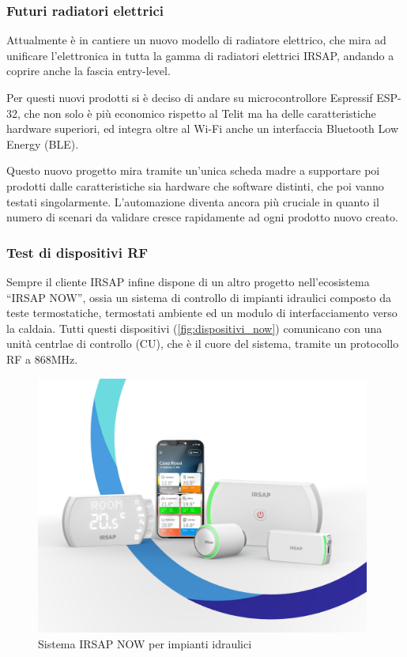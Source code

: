 \documentclass[12pt,a4paper,twoside,titlepage]{book}
\begin{document}
\subsubsection{Futuri radiatori elettrici}

Attualmente è in cantiere un nuovo modello di radiatore elettrico,
che mira ad unificare l'elettronica in tutta la gamma di radiatori elettrici
IRSAP, andando a coprire anche la fascia entry-level.

Per questi nuovi prodotti si è deciso di andare su microcontrollore Espressif
ESP-32, che non solo è più economico rispetto al Telit ma ha delle caratteristiche
hardware superiori, ed integra oltre al Wi-Fi anche un interfaccia Bluetooth Low Energy (BLE).

Questo nuovo progetto mira tramite un'unica scheda madre a supportare poi
prodotti dalle caratteristiche sia hardware che software distinti, che poi vanno
testati singolarmente. L'automazione diventa ancora più cruciale in quanto il
numero di scenari da validare cresce rapidamente ad ogni prodotto nuovo creato.

\subsubsection{Test di dispositivi RF}

Sempre il cliente IRSAP infine dispone di un altro progetto nell'ecosistema ``IRSAP NOW'',
ossia un sistema di controllo di impianti idraulici composto da teste termostatiche,
termostati ambiente ed un modulo di interfacciamento verso la caldaia. Tutti questi
dispositivi (\autoref{fig:dispositivi_now}) comunicano con una unità centrlae di controllo
(CU), che è il cuore del sistema, tramite un protocollo RF a 868MHz.

\begin{figure}[h]
    \centering
    \includegraphics[width=11cm]{img/now.jpeg}
    \caption{Sistema IRSAP NOW per impianti idraulici}
    \label{fig:dispositivi_now}
\end{figure}
\end{document}
